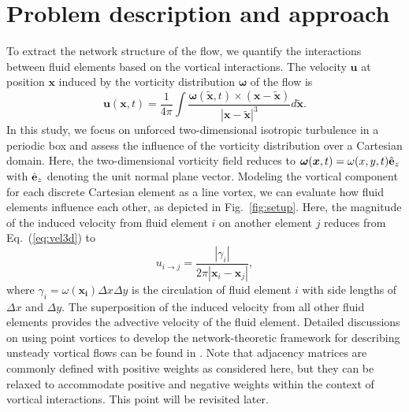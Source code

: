 \documentclass{jfm}
\begin{document}
\section{Problem description and approach}

To extract the network structure of the flow, we quantify the interactions between fluid elements based on the vortical interactions.  The velocity $\boldsymbol{u}$ at position $\boldsymbol{x}$ induced by the vorticity distribution $\boldsymbol{\omega}$ of the flow is 
\begin{equation}
   \boldsymbol{u}(\boldsymbol{x},t) 
   = \frac{1}{4\pi} 
   \int \frac{\boldsymbol{\omega}(\tilde{\boldsymbol{x}},t) \times (\boldsymbol{x}-\tilde{\boldsymbol{x}})}
   {|\boldsymbol{x} - \tilde{\boldsymbol{x}}|^3} d\tilde{\boldsymbol{x}}.
   \label{eq:vel3d}
\end{equation}
In this study, we focus on unforced two-dimensional isotropic turbulence in a periodic box and assess the influence of the vorticity distribution over a Cartesian domain.  Here, the two-dimensional vorticity field reduces to $\boldsymbol{\omega}(\boldsymbol{x},t) = \omega(x,y,t)\hat{\bf e}_z$ with $\hat{\bf e}_z$ denoting the unit normal plane vector.  Modeling the vortical component for each discrete Cartesian element as a line vortex, we can evaluate how fluid elements influence each other, as depicted in Fig.~\ref{fig:setup}.  
Here, the magnitude of the induced velocity from fluid element $i$ on another element $j$ reduces from Eq.~(\ref{eq:vel3d}) to
\begin{equation}
   u_{i \rightarrow j} = \frac{|\gamma_i|}{2\pi | \boldsymbol{x}_i-\boldsymbol{x}_j |}, 
   \label{eq:vel2d}
\end{equation}
where $\gamma_i = \omega(\boldsymbol{x_i}) \Delta x \Delta y$ is the circulation of fluid element $i$ with side lengths of $\Delta x$ and $\Delta y$.  The superposition of the induced velocity from all other fluid elements provides the advective velocity of the fluid element.  Detailed discussions on using point vortices to develop the network-theoretic framework for describing unsteady vortical flows can be found in \cite{Nair:JFM15}.  Note that adjacency matrices are commonly defined with positive weights as considered here, but they can be relaxed to accommodate positive and negative weights within the context of vortical interactions.  This point will be revisited later.
\end{document}

